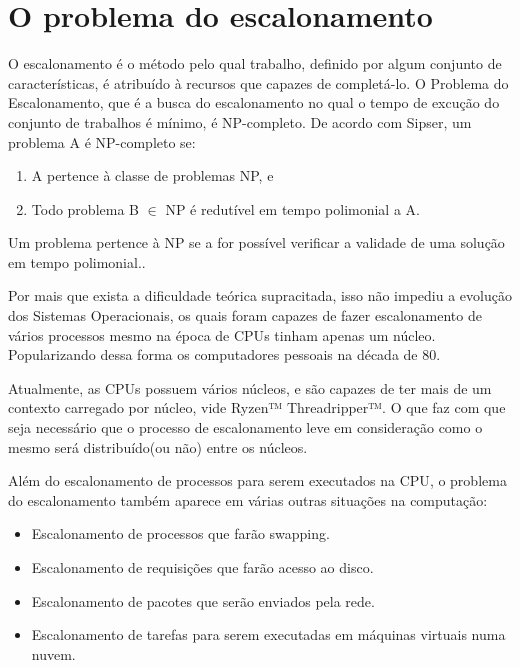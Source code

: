 

\section{O problema do escalonamento}

O escalonamento é o método pelo qual trabalho, definido por algum conjunto de características, é atribuído à recursos que capazes de completá-lo. O Problema do Escalonamento, que é a busca do escalonamento no qual o tempo de excução do conjunto de trabalhos é mínimo, é NP-completo\cite{ULLMAN1975384}. De acordo com Sipser\cite{SIPSER}, um problema A é NP-completo se:

\begin{enumerate}
	\item A pertence à classe de problemas NP, e
	\item Todo problema B \begin{math}\in\end{math} NP é redutível em tempo polimonial  a A.
\end{enumerate}

Um problema pertence à NP se a for possível verificar a validade de uma solução em tempo polimonial.\cite{SIPSER}\cite{Cook:1971:CTP:800157.805047}.

Por mais que exista a dificuldade teórica supracitada, isso não impediu a evolução dos Sistemas Operacionais, os quais foram capazes de fazer escalonamento de vários processos mesmo na época de \acrfull{CPU}s tinham apenas um núcleo. Popularizando dessa forma os computadores pessoais na década de 80.

Atualmente, as \acrshort{CPU}s possuem vários núcleos, e são capazes de ter mais de um contexto carregado por núcleo, vide Ryzen™ Threadripper™\cite{Ryzen}. O que faz com que seja necessário que o processo de escalonamento leve em consideração como o mesmo será distribuído(ou não) entre os núcleos.

Além do escalonamento de processos para serem executados na \acrshort{CPU}, o problema do escalonamento também aparece em várias outras situações na computação:

\begin{itemize}
	\item Escalonamento de processos que farão swapping.
	\item Escalonamento de requisições que farão acesso ao disco.
	\item Escalonamento de pacotes que serão enviados pela rede.
	\item Escalonamento de tarefas para serem executadas em máquinas virtuais numa nuvem.
\end{itemize}

